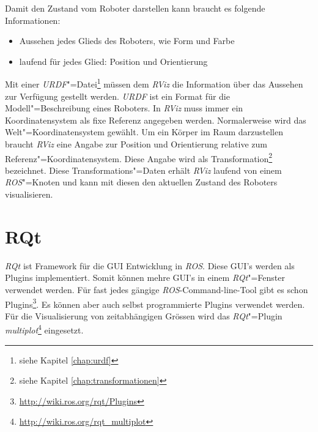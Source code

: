 Damit  den Zustand vom Roboter darstellen kann braucht es folgende Informationen:
\begin{itemize}
\item Aussehen jedes Glieds des Roboters, wie Form und Farbe 
\item laufend für jedes Glied: Position und Orientierung
\end{itemize}

Mit einer \textit{URDF}"=Datei\footnote{siehe Kapitel \ref{chap:urdf}} müssen dem \textit{RViz} die Information über das Aussehen zur Verfügung gestellt werden.
\textit{URDF} ist ein Format für die Modell"=Beschreibung eines Roboters.
In \textit{RViz} muss immer ein Koordinatensystem als fixe Referenz angegeben werden.
Normalerweise wird das Welt"=Koordinatensystem gewählt.
Um ein Körper im Raum darzustellen braucht \textit{RViz} eine Angabe zur Position und Orientierung relative zum Referenz"=Koordinatensystem.
Diese Angabe wird als Transformation\footnote{siehe Kapitel \ref{chap:transformationen}} bezeichnet.
Diese Transformations"=Daten erhält \textit{RViz} laufend von einem \textit{ROS}"=Knoten und kann mit diesen den aktuellen Zustand des Roboters visualisieren.




\section{RQt}
\label{chap:rqt}
\textit{RQt} ist Framework für die GUI Entwicklung in \textit{ROS}.
Diese GUI's werden als Plugins implementiert.
Somit können mehre GUI's in einem \textit{RQt}"=Fenster verwendet werden.
Für fast jedes gängige \textit{ROS}-Command-line-Tool gibt es schon Plugins\footnote{\url{http://wiki.ros.org/rqt/Plugins}}.
Es können aber auch selbst programmierte Plugins verwendet werden. 
Für die Visualisierung von zeitabhängigen Grössen wird das \textit{RQt}"=Plugin \textit{multiplot}\footnote{\url{http://wiki.ros.org/rqt_multiplot}} eingesetzt. %

